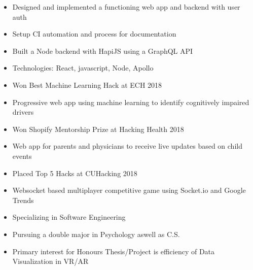 

\begin{itemize}
\item Designed and implemented a functioning web app and backend with user auth
\item Setup CI automation and process for documentation 
\item Built a Node backend with HapiJS using a GraphQL API
\item Technologies: React, javascript, Node, Apollo
\end{itemize}

\divider

\begin{itemize}
\item Won Best Machine Learning Hack at ECH 2018
\item Progressive web app using machine learning to identify cognitively impaired drivers
\end{itemize}

\divider

\begin{itemize}
\item Won Shopify Mentorship Prize at Hacking Health 2018
\item Web app for parents and physicians to receive live updates based on child events
\end{itemize}

\divider

\begin{itemize}
\item Placed Top 5 Hacks at CUHacking 2018
\item Websocket based multiplayer competitive game using Socket.io and Google Trends
\end{itemize}

\divider




\begin{itemize}
\item Specializing in Software Engineering
\item Pursuing a double major in Psychology aswell as C.S. 
\item Primary interest for Honours Thesis/Project is efficiency of Data Visualization in VR/AR
\end{itemize}
{}
